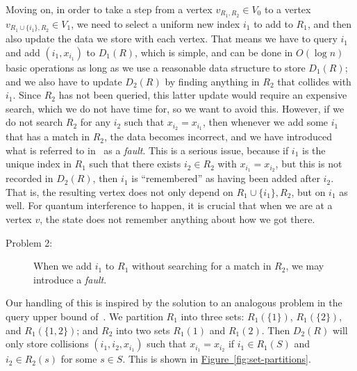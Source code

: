 \documentclass{theoretics}
\newcommand{\fig}[1]{\hyperref[fig:#1]{Figure~\ref*{fig:#1}}}
\renewcommand{\>}{\rangle}
\newcommand{\<}{\langle}
\renewcommand{\(}{\left(}
\renewcommand{\)}{\right)}
\begin{document}
Moving on, in order to take a step from a vertex $v_{R_1,R_2}\in V_0$ to a vertex $v_{R_1\cup\{i_1\},R_2}\in V_1$, we need to select a uniform new index $i_1$ to add to $R_1$, and then also update the data we store with each vertex. That means we have to query $i_1$ and add $(i_1,x_{i_1})$ to $D_1(R)$, which is simple, and can be done in $O(\log n)$ basic operations as long as we use a reasonable data structure to store $D_1(R)$; and we also have to update $D_2(R)$ by finding anything in $R_2$ that collides with $i_1$. Since $R_2$ has not been queried, this latter update would require an expensive search, which we do not have time for, so we want to avoid this. However, if we do not search $R_2$ for any $i_2$ such that $x_{i_2}=x_{i_1}$, then whenever we add some $i_1$ that has a match in $R_2$, the data becomes incorrect, and we have introduced what is referred to in~\cite{belovs2012kDist} as a \emph{fault}. This is a serious issue, because if $i_1$ is the unique index in $R_1$ such that there exists $i_2\in R_2$ with $x_{i_1}=x_{i_2}$, but this is not recorded in $D_2(R)$, then $i_1$ is ``remembered'' as having been added after $i_2$. That is, the resulting vertex does not only depend on $R_1\cup\{i_1\},R_2$, but on $i_1$ as well. For quantum interference to happen, it is crucial that when we are at a vertex $v$, the state does not remember anything about how we got there. 
\begin{description}
\item[Problem 2:] When we add $i_1$ to $R_1$ without searching for a match in $R_2$, we may introduce a \emph{fault}. 
\end{description}Our handling of this is inspired by the solution to an analogous problem in the query upper bound of~\cite{belovs2012kDist}. We partition $R_1$ into three sets: $R_1(\{1\})$, $R_1(\{2\})$, and $R_1(\{1,2\})$; and $R_2$ into two sets $R_1(1)$ and $R_1(2)$. Then $D_2(R)$ will only store collisions $(i_1,i_2,x_{i_1})$ such that $x_{i_1}=x_{i_2}$ if $i_1\in R_1(S)$ and $i_2\in R_2(s)$ for some $s\in S$. This is shown in \fig{set-partitions}.
\end{document}

